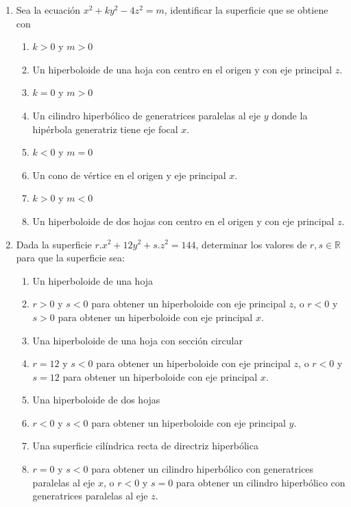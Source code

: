 \documentclass[a4paper]{article}
\newcommand{\answer}{\item[**]}
\newcommand{\exercise}{\item}
\begin{document}
\begin{enumerate}
\begin{multicols}{2}
\begin{enumerate} [label=(\alph*)]
	\end{enumerate}
	\end{multicols}


	\exercise Sea la ecuación $x^2+ky^2-4z^2=m$, identificar la superficie que se obtiene con
	\begin{multicols}{2}
	\begin{enumerate} [label=(\alph*)]
		
		\item $k>0$ y $m>0$
		\answer Un hiperboloide de una hoja con centro en el origen y con eje principal $z$.

		\item $k=0$ y $m>0$
		\answer Un cilindro hiperbólico de generatrices paralelas al eje $y$ donde la hipérbola generatriz tiene eje focal $x$.

		\item $k<0$ y $m=0$
		\answer Un cono de vértice en el origen y eje principal $x$.

		\item $k>0$ y $m<0$
		\answer Un hiperboloide de dos hojas con centro en el origen y con eje principal $z$.

	\end{enumerate}
	\end{multicols}


	\exercise Dada la superficie $r.x^2+12y^2+s.z^2=144$, determinar los valores de $r,s \in \mathbb{R}$ para que la superficie sea:
	\begin{multicols}{2}
	\begin{enumerate} [label=(\alph*)]
		
		\item Un hiperboloide de una hoja
		\answer $r>0$ y $s<0$ para obtener un hiperboloide con eje principal $z$, o $r<0$ y $s>0$ para obtener un hiperboloide con eje principal $x$.

		\item Una hiperboloide de una hoja con sección circular
		\answer $r=12$ y $s<0$ para obtener un hiperboloide con eje principal $z$, o $r<0$ y $s=12$ para obtener un hiperboloide con eje principal $x$.

		\item Una hiperboloide de dos hojas
		\answer $r<0$ y $s<0$ para obtener un hiperboloide con eje principal $y$.

		\item Una superficie cilíndrica recta de directriz hiperbólica
		\answer $r=0$ y $s<0$ para obtener un cilindro hiperbólico con generatrices paralelas al eje $x$, o $r<0$ y $s=0$ para obtener un cilindro hiperbólico con generatrices paralelas al eje $z$.


\end{enumerate}
\end{multicols}
\end{enumerate}
\end{document}
